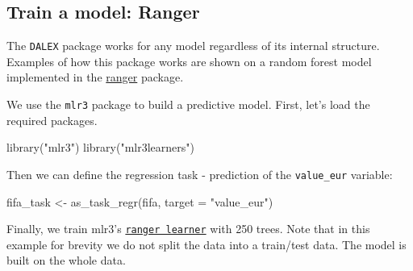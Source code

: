 \documentclass[
]{scrbook}
\newenvironment{Shaded}{\begin{snugshade}}{\end{snugshade}}
\newcommand{\AttributeTok}[1]{\textcolor[rgb]{0.77,0.63,0.00}{#1}}
\newcommand{\DecValTok}[1]{\textcolor[rgb]{0.00,0.00,0.81}{#1}}
\newcommand{\FunctionTok}[1]{\textcolor[rgb]{0.00,0.00,0.00}{#1}}
\newcommand{\NormalTok}[1]{#1}
\newcommand{\OtherTok}[1]{\textcolor[rgb]{0.56,0.35,0.01}{#1}}
\newcommand{\SpecialCharTok}[1]{\textcolor[rgb]{0.00,0.00,0.00}{#1}}
\newcommand{\StringTok}[1]{\textcolor[rgb]{0.31,0.60,0.02}{#1}}
\renewenvironment{Shaded} {\begin{snugshade}\small} {\end{snugshade}}
\begin{document}
\hypertarget{interpretability-train-ranger}{%
\subsection{Train a model: Ranger}\label{interpretability-train-ranger}}

The \texttt{DALEX} package works for any model regardless of its internal structure. Examples of how this package works are shown on a random forest model implemented in the \href{https://cran.r-project.org/package=ranger}{ranger} package.

We use the \texttt{mlr3} package to build a predictive model.
First, let's load the required packages.

\begin{Shaded}
\begin{Highlighting}[]
\FunctionTok{library}\NormalTok{(}\StringTok{"mlr3"}\NormalTok{)}
\FunctionTok{library}\NormalTok{(}\StringTok{"mlr3learners"}\NormalTok{)}
\end{Highlighting}
\end{Shaded}

Then we can define the regression task - prediction of the \texttt{value\_eur} variable:

\begin{Shaded}
\begin{Highlighting}[]
\NormalTok{fifa\_task }\OtherTok{\textless{}{-}} \FunctionTok{as\_task\_regr}\NormalTok{(fifa, }\AttributeTok{target =} \StringTok{"value\_eur"}\NormalTok{)}
\end{Highlighting}
\end{Shaded}

Finally, we train mlr3's \href{https://mlr3learners.mlr-org.com/reference/mlr_learners_regr.ranger.html}{\texttt{ranger\ learner}} with 250 trees. Note that in this example for brevity we do not split the data into a train/test data. The model is built on the whole data.

\begin{Shaded}
\end{Shaded}
\end{document}
